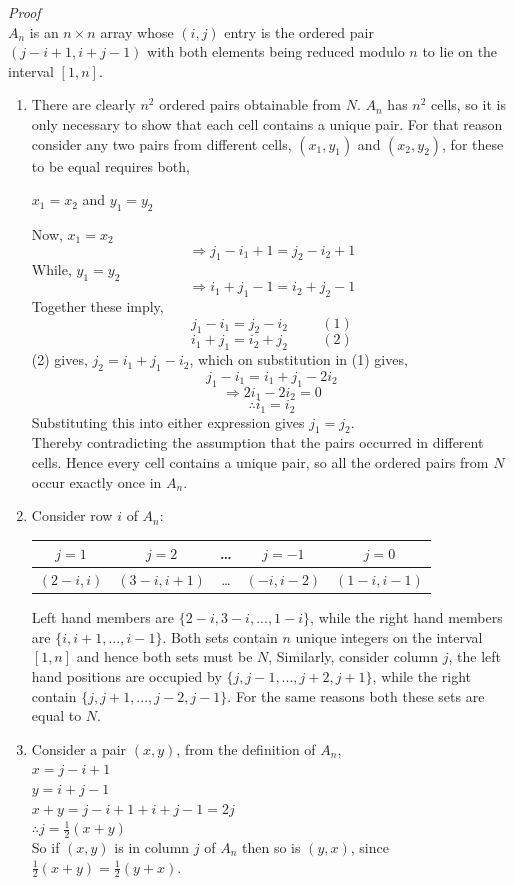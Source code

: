 \documentclass[
  12pt,
  a4paper]{book}
\begin{document}
\emph{Proof}\\
\(A_n\) is an \(n \times n\) array whose \((i,j)\) entry is the ordered pair
\((j-i+1,i+j-1)\) with both elements being reduced modulo \(n\) to lie on
the interval \([1,n]\).

\begin{enumerate}
\def\labelenumi{\arabic{enumi}.}
\item
  There are clearly \(n^2\) ordered pairs obtainable from \(N\). \(A_n\) has
  \(n^2\) cells, so it is only necessary to show that each cell contains
  a unique pair. For that reason consider any two pairs from different
  cells, \((x_1,y_1)\) and \((x_2,y_2)\), for these to be equal requires
  both,

  \(x_1=x_2\) and \(y_1=y_2\)

  Now, \(x_1 = x_2\) \[\Rightarrow j_1-i_1 + 1 = j_2-i_2+1\] While,
  \(y_1=y_2\) \[\Rightarrow i_1+j_1 - 1 = i_2+j_2-1\] Together these
  imply, \[j_1-i_1=j_2-i_2 \hspace{1cm}(1)\]
  \[i_1+j_1=i_2+j_2 \hspace{1cm}(2)\] (2) gives, \(j_2=i_1+j_1-i_2\),
  which on substitution in (1) gives, \[j_1-i_1=i_1+j_1-2i_2\]
  \[\Rightarrow 2i_1-2i_2=0\] \[\therefore i_1=i_2\] Substituting this
  into either expression gives \(j_1 = j_2\).\\
  Thereby contradicting the assumption that the pairs occurred in
  different cells. Hence every cell contains a unique pair, so all the
  ordered pairs from \(N\) occur exactly once in \(A_n\).
\item
  Consider row \(i\) of \(A_n\):

  \begin{longtable}[]{@{}ccccc@{}}
  \toprule
  \(j=1\) & \(j=2\) & \ldots{} & \(j=-1\) & \(j=0\)\tabularnewline
  \midrule
  \endhead
  \((2-i,i)\) & \((3-i,i+1)\) & \ldots{} & \((-i,i-2)\) & \((1-i,i-1)\)\tabularnewline
  \bottomrule
  \end{longtable}

  Left hand members are \(\{2-i,3-i,...,1-i\}\), while the right hand
  members are \(\{i,i+1,...,i-1\}\). Both sets contain \(n\) unique
  integers on the interval \([1,n]\) and hence both sets must be \(N\),
  Similarly, consider column \(j\), the left hand positions are occupied
  by \(\{j,j-1,...,j+2,j+1\}\), while the right contain
  \(\{j,j+1,...,j-2,j-1\}\). For the same reasons both these sets are
  equal to \(N\).
\item
  Consider a pair \((x,y)\), from the definition of \(A_n\),\\
  \(x=j-i+1\)\\
  \(y=i+j-1\)\\
  \(x+y=j-i+1+i+j-1=2j\)\\
  \(\therefore j= \frac{1}{2} (x+y)\)\\
  So if \((x,y)\) is in column \(j\) of \(A_n\) then so is \((y,x)\), since
  \(\frac{1}{2}(x+y)=\frac{1}{2}(y+x)\).
\end{enumerate}
\end{document}
